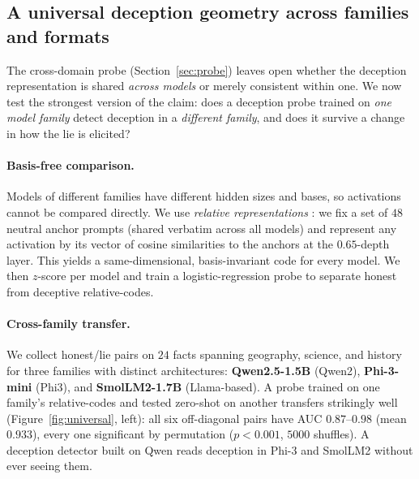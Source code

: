 \documentclass[11pt]{article}
\begin{document}
\subsection{A universal deception geometry across families and formats}
\label{sec:universal}

The cross-domain probe (Section~\ref{sec:probe}) leaves open whether the
deception representation is shared \emph{across models} or merely consistent
within one. We now test the strongest version of the claim: does a deception
probe trained on \emph{one model family} detect deception in a \emph{different
family}, and does it survive a change in how the lie is elicited?

\paragraph{Basis-free comparison.} Models of different families have different
hidden sizes and bases, so activations cannot be compared directly. We use
\emph{relative representations} \citep{moschella2023relative}: we fix a set of
$48$ neutral anchor prompts (shared verbatim across all models) and represent
any activation by its vector of cosine similarities to the anchors at the
$0.65$-depth layer. This yields a same-dimensional, basis-invariant code for
every model. We then $z$-score per model and train a logistic-regression probe
to separate honest from deceptive relative-codes.

\paragraph{Cross-family transfer.} We collect honest/lie pairs on $24$ facts
spanning geography, science, and history for three families with distinct
architectures: \textbf{Qwen2.5-1.5B} (Qwen2), \textbf{Phi-3-mini} (Phi3), and
\textbf{SmolLM2-1.7B} (Llama-based). A probe trained on one family's
relative-codes and tested zero-shot on another transfers strikingly well
(Figure~\ref{fig:universal}, left): all six off-diagonal pairs have AUC
$0.87$--$0.98$ (mean $\mathbf{0.933}$), every one significant by permutation
($p<0.001$, $5000$ shuffles). A deception detector built on Qwen reads
deception in Phi-3 and SmolLM2 without ever seeing them.
\end{document}

